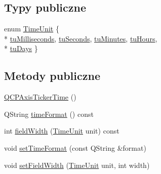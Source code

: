 \subsection*{Typy publiczne}
\begin{DoxyCompactItemize}
\item 
enum \hyperlink{class_q_c_p_axis_ticker_time_a5c48ded8c6d3a1aca9b68219469fea3e}{Time\+Unit} \{ \\*
\hyperlink{class_q_c_p_axis_ticker_time_a5c48ded8c6d3a1aca9b68219469fea3ea809db637d2a7f601287c8790facc25cf}{tu\+Milliseconds}, 
\hyperlink{class_q_c_p_axis_ticker_time_a5c48ded8c6d3a1aca9b68219469fea3ea22b2c1842215272ae827eea2d1cc037d}{tu\+Seconds}, 
\hyperlink{class_q_c_p_axis_ticker_time_a5c48ded8c6d3a1aca9b68219469fea3ea682de6640daef46cffd8a080348d7d00}{tu\+Minutes}, 
\hyperlink{class_q_c_p_axis_ticker_time_a5c48ded8c6d3a1aca9b68219469fea3ea83a5713594424ba17f1f62f18f0e5935}{tu\+Hours}, 
\\*
\hyperlink{class_q_c_p_axis_ticker_time_a5c48ded8c6d3a1aca9b68219469fea3eaf9729e64545307a80a0e3527d6da6556}{tu\+Days}
 \}
\end{DoxyCompactItemize}
\subsection*{Metody publiczne}
\begin{DoxyCompactItemize}
\item 
\hyperlink{class_q_c_p_axis_ticker_time_a5145aac1d2117fdac411d9e8552cc41b}{Q\+C\+P\+Axis\+Ticker\+Time} ()
\item 
Q\+String \hyperlink{class_q_c_p_axis_ticker_time_a7131ca197593d941adaea6faa75249d0}{time\+Format} () const 
\item 
int \hyperlink{class_q_c_p_axis_ticker_time_a13f16bf1335ab365a841496c27a6b71c}{field\+Width} (\hyperlink{class_q_c_p_axis_ticker_time_a5c48ded8c6d3a1aca9b68219469fea3e}{Time\+Unit} unit) const 
\item 
void \hyperlink{class_q_c_p_axis_ticker_time_a2f30b6e5125bce4256be9ce3177088ea}{set\+Time\+Format} (const Q\+String \&format)
\item 
void \hyperlink{class_q_c_p_axis_ticker_time_adc13e54fc969be98a5c0e3fa0dbaa293}{set\+Field\+Width} (\hyperlink{class_q_c_p_axis_ticker_time_a5c48ded8c6d3a1aca9b68219469fea3e}{Time\+Unit} unit, int width)
\end{DoxyCompactItemize}
